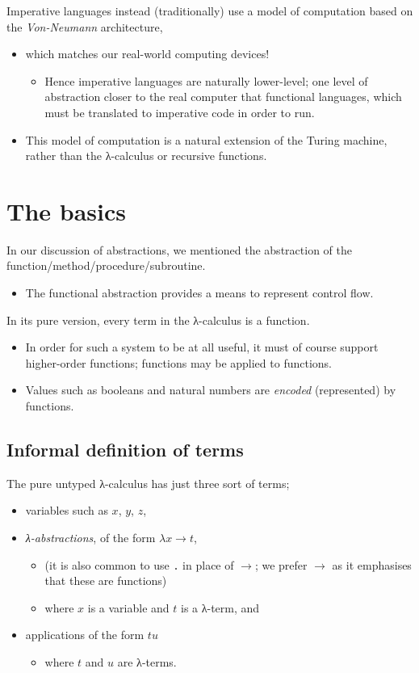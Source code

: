 \documentclass[11pt]{article}
\theoremstyle{definition}
\begin{document}
Imperative languages instead (traditionally) use a model of computation
based on the \emph{Von-Neumann} architecture,
\begin{itemize}
\item which matches our real-world computing devices!
\begin{itemize}
\item Hence imperative languages are naturally lower-level;
one level of abstraction closer to the real computer
that functional languages, which must be translated
to imperative code in order to run.
\end{itemize}
\item This model of computation is a natural extension
of the Turing machine, rather than the λ-calculus
or recursive functions.
\end{itemize}

\section{The basics}
\label{sec:orgc60885c}
In our discussion of abstractions, we mentioned
the abstraction of the function/method/procedure/subroutine.
\begin{itemize}
\item The functional abstraction provides a means
to represent control flow.
\end{itemize}

In its pure version, every term in the λ-calculus
is a function.
\begin{itemize}
\item In order for such a system to be at all useful,
it must of course support higher-order functions;
functions may be applied to functions.
\item Values such as booleans and natural numbers
are \emph{encoded} (represented) by functions.
\end{itemize}

\subsection{Informal definition of terms}
\label{sec:org5fc934d}
The pure untyped λ-calculus has just three sort of terms;
\begin{itemize}
\item variables such as \(x\), \(y\), \(z\),
\item \emph{λ-abstractions}, of the form \(λ x → t\),
\begin{itemize}
\item (it is also common to use \(․\) in place of \(→\);
we prefer \(→\) as it emphasises that these are functions)
\item where \(x\) is a variable and \(t\) is a λ-term, and
\end{itemize}
\item applications of the form \(t u\)
\begin{itemize}
\item where \(t\) and \(u\) are λ-terms.
\end{itemize}
\end{itemize}
\end{document}
